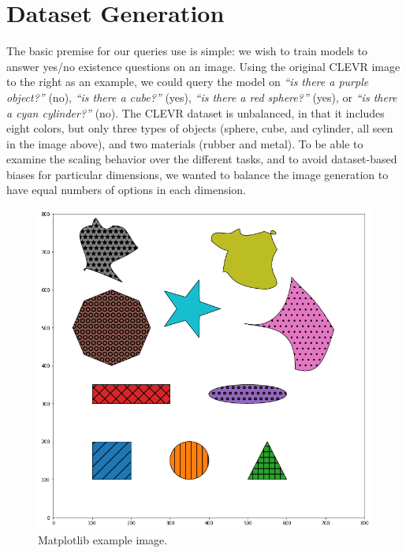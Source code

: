 \section{Dataset Generation}
The basic premise for our queries use is simple: we wish to train models to answer yes/no existence questions on an image. Using the original CLEVR image to the right as an example, we could query the model on \textit{``is there a purple object?''} (no), \textit{``is there a cube?''} (yes), \textit{``is there a red sphere?''} (yes), or \textit{``is there a cyan cylinder?''} (no). The CLEVR dataset is unbalanced, in that it includes eight colors, but only three types of objects (sphere, cube, and cylinder, all seen in the image above), and two materials (rubber and metal). To be able to examine the scaling behavior over the different tasks, and to avoid dataset-based biases for particular dimensions, we wanted to balance the image generation to have equal numbers of options in each dimension.

\begin{figure}
\vspace{-.4in}
\begin{spacing}{1.0}
\centering
\includegraphics[width=.95\linewidth]{ch-dataset-task-benchmark/figures/dataset/matplotlib_image.png}
\caption{Matplotlib example image.}
\label{fig:dataset-matplotlib-image}
\end{spacing}
\end{figure}

